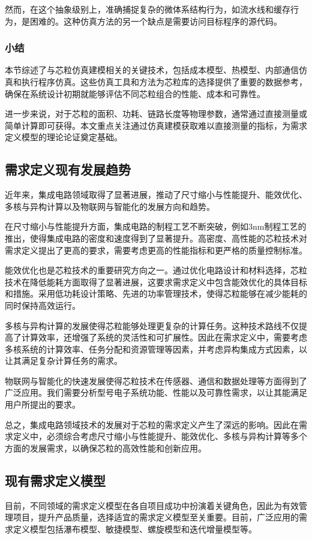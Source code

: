 \documentclass[bachelor]{thesis-uestc}
\begin{document}
然而，在这个抽象级别上，准确捕捉复杂的微体系结构行为，如流水线和缓存行为，是困难的。这种仿真方法的另一个缺点是需要访问目标程序的源代码。


\subsubsection{小结}
本节综述了与芯粒仿真建模相关的关键技术，包括成本模型、热模型、内部通信仿真和执行程序仿真。这些仿真工具和方法为芯粒库的选择提供了重要的数据参考，确保在系统设计初期就能够评估不同芯粒组合的性能、成本和可靠性。


进一步来说，对于芯粒的面积、功耗、链路长度等物理参数，通常通过直接测量或简单计算即可获得。本文重点关注通过仿真建模获取难以直接测量的指标，为需求定义模型的理论论证奠定基础。 

\subsection{需求定义现有发展趋势}
近年来，集成电路领域取得了显著进展，推动了尺寸缩小与性能提升、能效优化、多核与异构计算以及物联网与智能化的发展方向和趋势。


在尺寸缩小与性能提升方面，集成电路的制程工艺不断突破，例如3nm制程工艺的推出，使得集成电路的密度和速度得到了显著提升。高密度、高性能的芯粒技术对需求定义提出了更高的要求，需要考虑更高的性能指标和更严格的质量控制标准。


能效优化也是芯粒技术的重要研究方向之一。通过优化电路设计和材料选择，芯粒技术在降低能耗方面取得了显著进展，这要求需求定义中包含能效优化的具体目标和措施。采用低功耗设计策略、先进的功率管理技术，使得芯粒能够在减少能耗的同时保持高效运行。


多核与异构计算的发展使得芯粒能够处理更复杂的计算任务。这种技术路线不仅提高了计算效率，还增强了系统的灵活性和可扩展性。因此在需求定义中，需要考虑多核系统的计算效率、任务分配和资源管理等因素，并考虑异构集成方式因素，以让其满足复杂计算任务的需求。


物联网与智能化的快速发展使得芯粒技术在传感器、通信和数据处理等方面得到了广泛应用。我们需要分析型号电子系统功能、性能以及可靠性需求，以让其能满足用户所提出的要求。


总之，集成电路领域技术的发展对于芯粒的需求定义产生了深远的影响。因此在需求定义中，必须综合考虑尺寸缩小与性能提升、能效优化、多核与异构计算等多个方面的发展需求，以确保芯粒的高效性能和创新应用。


\subsection{现有需求定义模型}
目前，不同领域的需求定义模型在各自项目成功中扮演着关键角色，因此为有效管理项目，提升产品质量，选择适宜的需求定义模型至关重要。目前，广泛应用的需求定义模型包括瀑布模型、敏捷模型、螺旋模型和迭代增量模型等。
\end{document}
